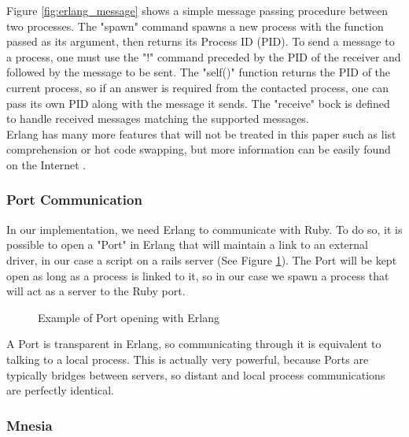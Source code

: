 Figure \ref{fig:erlang_message} shows a simple message passing procedure between two processes. The "spawn" command spawns a new process with the function passed as its argument, then returns its Process ID (PID). To send a message to a process, one must use the "!" command preceded by the PID of the receiver and followed by the message to be sent. The "self()" function returns the PID of the current process, so if an answer is required from the contacted process, one can pass its own PID along with the message it sends. The "receive" bock is defined to handle received messages matching the supported messages.\\

Erlang has many more features that will not be treated in this paper such as list comprehension or hot code swapping, but more information can be easily found on the Internet \cite{Erl10}.

\subsubsection{Port Communication}

In our implementation, we need Erlang to communicate with Ruby. To do so, it is possible to open a "Port" in Erlang that will maintain a link to an external driver, in our case a script on a rails server (See Figure \ref{fig:erlang_port}). The Port will be kept open as long as a process is linked to it, so in our case we spawn a process that will act as a server to the Ruby port.\\

\begin{figure}[ht]
  \centering
  \caption{Example of Port opening with Erlang}
  \label{fig:erlang_port}
\end{figure}

A Port is transparent in Erlang, so communicating through it is equivalent to talking to a local process. This is actually very powerful, because Ports are typically bridges between servers, so distant and local process communications are perfectly identical.

\subsubsection{Mnesia}

